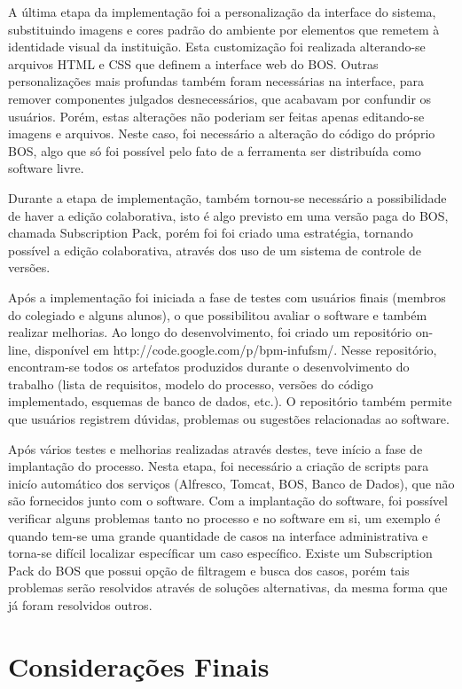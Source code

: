 \documentclass[12pt]{article}
\begin{document}
A última etapa da implementação foi a personalização da interface do sistema, substituindo imagens e cores padrão do ambiente por elementos que remetem à identidade visual da instituição. Esta customização foi realizada alterando-se arquivos HTML e CSS que definem a interface web do BOS. Outras personalizações mais profundas também foram necessárias na interface, para remover componentes julgados desnecessários, que acabavam por confundir os usuários. Porém, estas alterações não poderiam ser feitas apenas editando-se imagens e arquivos. Neste caso, foi necessário a alteração do código do próprio BOS, algo que só foi possível pelo fato de a ferramenta ser distribuída como software livre.

Durante a etapa de implementação, também tornou-se necessário a possibilidade de haver a edição colaborativa, isto é algo previsto em uma versão paga do BOS, chamada Subscription Pack, porém foi foi criado uma estratégia, tornando possível a edição colaborativa, através dos uso de um sistema de controle de versões.

Após a implementação foi iniciada a fase de testes com usuários finais (membros do colegiado e alguns alunos), o que possibilitou avaliar o software e também realizar melhorias. Ao longo do desenvolvimento, foi criado um repositório on-line, disponível em http://code.google.com/p/bpm-infufsm/. Nesse repositório, encontram-se todos os artefatos produzidos durante o desenvolvimento do trabalho (lista de requisitos, modelo do processo, versões do código implementado, esquemas de banco de dados, etc.). O repositório também permite que usuários registrem dúvidas, problemas ou sugestões relacionadas ao software.

Após vários testes e melhorias realizadas através destes, teve início a fase de implantação do processo. Nesta etapa, foi necessário a criação de scripts para inicío automático dos serviços (Alfresco, Tomcat, BOS, Banco de Dados), que não são fornecidos junto com o software. Com a implantação do software, foi possível verificar alguns problemas tanto no processo e no software em si, um exemplo é quando tem-se uma grande quantidade de casos na interface administrativa e torna-se difícil localizar específicar um caso específico. Existe um Subscription Pack do BOS que possui opção de filtragem e busca dos casos, porém tais problemas serão resolvidos através de soluções alternativas, da mesma forma que já foram resolvidos outros.

\section{Considerações Finais}
\end{document}
